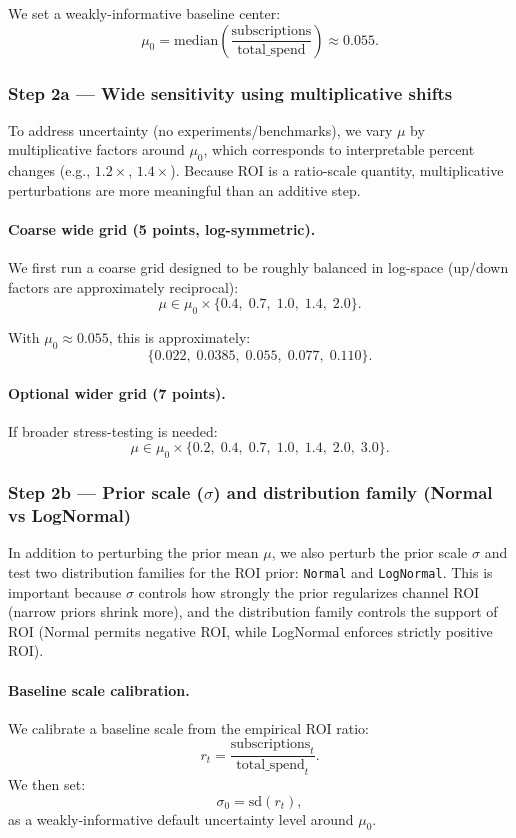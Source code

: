 \documentclass{article}
\begin{document}
We set a weakly-informative baseline center:
\[
\mu_0 = \mathrm{median}\!\left(\frac{\text{subscriptions}}{\text{total\_spend}}\right) \approx 0.055.
\]

\subsubsection*{Step 2a --- Wide sensitivity using multiplicative shifts}
To address uncertainty (no experiments/benchmarks), we vary $\mu$ by multiplicative factors around $\mu_0$, which corresponds to interpretable percent changes (e.g., $1.2\times$, $1.4\times$). Because ROI is a ratio-scale quantity, multiplicative perturbations are more meaningful than an additive step.

\paragraph{Coarse wide grid (5 points, log-symmetric).}
We first run a coarse grid designed to be roughly balanced in log-space (up/down factors are approximately reciprocal):
\[
\mu \in \mu_0 \times \{0.4,\; 0.7,\; 1.0,\; 1.4,\; 2.0\}.
\]

With $\mu_0 \approx 0.055$, this is approximately:
\[
\{0.022,\; 0.0385,\; 0.055,\; 0.077,\; 0.110\}.
\]

\paragraph{Optional wider grid (7 points).}
If broader stress-testing is needed:
\[
\mu \in \mu_0 \times \{0.2,\; 0.4,\; 0.7,\; 1.0,\; 1.4,\; 2.0,\; 3.0\}.
\]

\subsubsection*{Step 2b --- Prior scale ($\sigma$) and distribution family (Normal vs LogNormal)}

In addition to perturbing the prior mean $\mu$, we also perturb the prior scale $\sigma$ and test two distribution families for the ROI prior: \texttt{Normal} and \texttt{LogNormal}. This is important because $\sigma$ controls how strongly the prior regularizes channel ROI (narrow priors shrink more), and the distribution family controls the support of ROI (Normal permits negative ROI, while LogNormal enforces strictly positive ROI).

\paragraph{Baseline scale calibration.}
We calibrate a baseline scale from the empirical ROI ratio:
\[
r_t = \frac{\text{subscriptions}_t}{\text{total\_spend}_t}.
\]
We then set:
\[
\sigma_0 = \mathrm{sd}(r_t),
\]
as a weakly-informative default uncertainty level around $\mu_0$.
\end{document}
